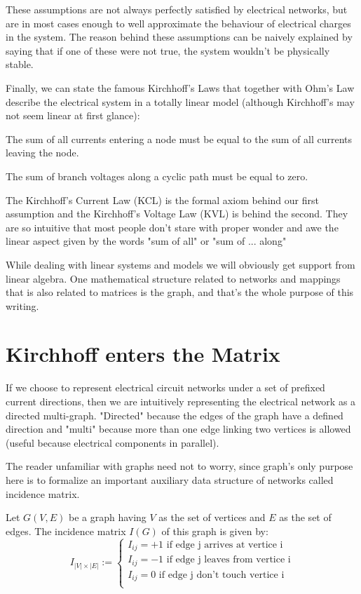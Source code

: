 \documentclass{comjnl}
\begin{document}
These assumptions are not always perfectly satisfied by electrical networks, but are in most cases enough to well approximate the behaviour of electrical charges in the system. The reason behind these assumptions can be naively explained by saying that if one of these were not true, the system wouldn't be physically stable.

Finally, we can state the famous Kirchhoff's Laws that together with Ohm's Law describe the electrical system in a totally linear model (although Kirchhoff's may not seem linear at first glance):
\begin{axiom}
The sum of all currents entering a node must be equal to the sum of all currents leaving the node.
\end{axiom}
\begin{axiom}
The sum of branch voltages along a cyclic path must be equal to zero.
\end{axiom}

The Kirchhoff's Current Law (KCL) is the formal axiom behind our first assumption and the Kirchhoff's Voltage Law (KVL) is behind the second. They are so intuitive that most people don't stare with proper wonder and awe the linear aspect given by the words "sum of all" or "sum of ... along"

While dealing with linear systems and models we will obviously get support from linear algebra. One mathematical structure related to networks and mappings that is also related to matrices is the graph, and that's the whole purpose of this writing.

\section{Kirchhoff enters the Matrix}
If we choose to represent electrical circuit networks under a set of prefixed current directions, then we are intuitively representing the electrical network as a directed multi-graph. "Directed" because the edges of the graph have a defined direction and "multi" because more than one edge linking two vertices is allowed (useful because electrical components in parallel).

The reader unfamiliar with graphs need not to worry, since graph's only purpose here is to formalize an important auxiliary data structure of networks called incidence matrix.

\begin{definition}
Let $G(V,E)$ be a graph having $V$ as the set of vertices and $E$ as the set of edges. The incidence matrix $I(G)$ of this graph is given by:
$$ I_{|V|\times|E|} :=
\begin{cases} 
I_{ij}=+1 \mbox{ if edge j arrives at vertice i}\\
I_{ij}=-1 \mbox{ if edge j leaves from vertice i}\\
I_{ij}=0 \mbox{ if edge j don't touch vertice i}\\
\end{cases}$$
\end{definition}
\end{document}
